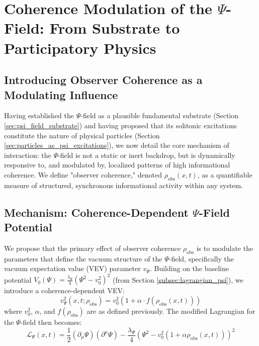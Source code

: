 \documentclass{report}
\begin{document}
\section{Coherence Modulation of the $\Psi$-Field: From Substrate to Participatory Physics}
\label{sec:coherence_modulation_psi}
    \subsection{Introducing Observer Coherence as a Modulating Influence}
    \label{subsec:observer_coherence_modulating}
    Having established the $\Psi$-field as a plausible fundamental substrate (Section \ref{sec:psi_field_substrate}) and having
    proposed that its solitonic excitations constitute the nature of physical particles (Section \ref{sec:particles_as_psi_excitations}),
    we now detail the core mechanism of interaction: the $\Psi$-field is not a static or inert backdrop,
    but is dynamically responsive to, and modulated by, localized patterns of high informational
    coherence. We define "observer coherence," denoted $\rho_{\text{obs}}(x, t)$, as a quantifiable measure of
    structured, synchronous informational activity within any system. %

    \subsection{Mechanism: Coherence-Dependent $\Psi$-Field Potential}
    \label{subsec:mechanism_coherence_potential}
    We propose that the primary effect of observer coherence $\rho_{\text{obs}}$ is to modulate the parameters
    that define the vacuum structure of the $\Psi$-field, specifically the vacuum expectation value (VEV)
    parameter $v_{\Psi}$. Building on the baseline potential $V_0(\Psi) = \frac{\lambda_{\Psi}}{4}(\Psi^2 - v_0^2)^2$ (from Section \ref{subsec:lagrangian_psi}),
    we introduce a coherence-dependent VEV:
    \begin{equation}
        v_{\Psi}^2(x, t; \rho_{\text{obs}}) = v_0^2(1 + \alpha \cdot f(\rho_{\text{obs}}(x, t)))
    \end{equation}
    where $v_0^2$, $\alpha$, and $f(\rho_{\text{obs}})$ are as defined previously. The modified Lagrangian for the $\Psi$-field then
    becomes:
    \begin{equation}
        \mathcal{L}_{\Psi}(x, t) = \frac{1}{2}(\partial_{\mu}\Psi)(\partial^{\mu}\Psi) - \frac{\lambda_{\Psi}}{4}\left(\Psi^2 - v_0^2(1 + \alpha\rho_{\text{obs}}(x, t))\right)^2 
    \end{equation}
\end{document}
